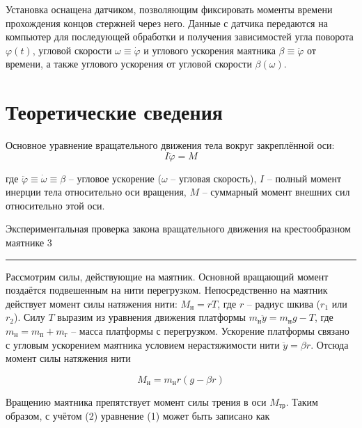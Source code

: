 \documentclass[12pt,a4paper]{scrartcl}
\begin{document}
	Установка оснащена датчиком, позволяющим фиксировать моменты времени прохождения концов стержней через него. Данные с датчика передаются на компьютер для последующей обработки и получения зависимостей угла поворота $\varphi(t)$, угловой скорости $\omega \equiv \dot{\varphi}$ и углового ускорения маятника $\beta \equiv \ddot{\varphi}$ от времени, а также углового ускорения от угловой скорости $\beta(\omega)$.
	
	\section{Теоретические сведения}
	
	 Основное уравнение вращательного движения тела вокруг закреплённой оси:
	 \begin{equation}
	 	I \ddot{\varphi} = M
	 \end{equation}
 
	 где $\ddot{\varphi} \equiv \dot{\omega} \equiv \beta$ -- угловое ускорение ($\omega$  -- угловая скорость), $I$ -- полный момент инерции тела относительно оси вращения, $M$ -- суммарный момент внешних сил относительно этой оси.
	 
	 
	 \newpage
	 
	 \begin{flushleft}
	 	\footnotesize{Экспериментальная проверка закона вращательного движения на крестообразном маятнике} \hspace{\fill} \footnotesize{3}
	 	\\[-0.3cm]\noindent\rule{\textwidth}{0.3pt}
	 \end{flushleft}
 
	Рассмотрим силы, действующие на маятник. Основной вращающий момент поздаётся подвешенным на нити перегрузком. Непосредственно на маятник действует момент силы натяжения нити: $M_{\text{н}} = rT$, где $r$ -- радиус шкива ($r_1$ или $r_2$). Силу $T$ выразим из уравнения движения платформы $m_{\text{н}}\ddot{y}= m_{\text{н}}g - T$, где $m_{\text{н}} = m_{\text{п}} + m_{\text{г}}$ -- масса платформы с перегрузком. Ускорение платформы связано с угловым ускорением маятника условием нерастяжимости нити $\ddot{y}=\beta r$. Отсюда момент силы натяжения нити 
	
	\begin{equation}
		M_{\text{н}} = m_{\text{н}} r(g - \beta r)
	\end{equation}

	Вращению маятника препятствует момент силы трения в оси  $M_{тр}$. Таким образом, с учётом (2) уравнение (1) может быть записано как
	
\end{document}
